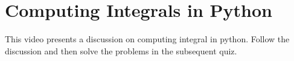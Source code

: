 %


\section{Computing Integrals in Python}
\begin{youtube}
This video presents a discussion on computing integral in python. Follow the discussion and then solve the problems in the subsequent quiz.
\end{youtube}




